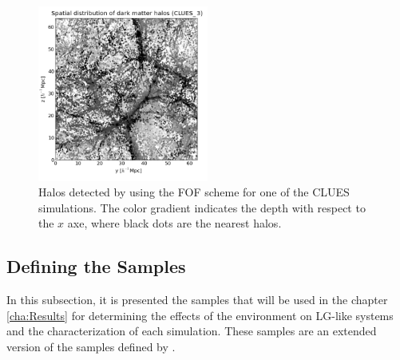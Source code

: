 \begin{figure}[htbp]
	\centering
	\includegraphics[width=0.5\textwidth]
	{./figures/3_nbody_simulations/Halos_Spatial_Distribution(CLUES_16953).png}

	\caption{\small{Halos detected by using the FOF scheme for one of the 
	CLUES simulations. The color gradient indicates the depth with respect to 
	the	$x$ axe, where black dots are the nearest halos.}}
	
	\label{fig:CLUES_FOF}
\end{figure}




	\subsection{Defining the Samples}
	\label{subsec:SampleOfPairsToUse}
	

In this subsection, it is presented the samples that will be used in the 
chapter \ref{cha:Results} for determining the effects of the environment on
LG-like systems and the characterization of each simulation. These samples 
are an extended version of the samples defined by \cite{forero2011}.



